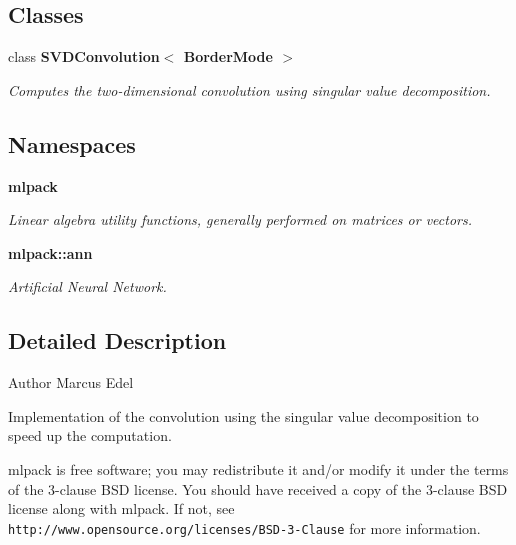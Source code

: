 \subsection*{Classes}
\begin{DoxyCompactItemize}
\item 
class \textbf{ S\+V\+D\+Convolution$<$ Border\+Mode $>$}
\begin{DoxyCompactList}\small\item\em Computes the two-\/dimensional convolution using singular value decomposition. \end{DoxyCompactList}\end{DoxyCompactItemize}
\subsection*{Namespaces}
\begin{DoxyCompactItemize}
\item 
 \textbf{ mlpack}
\begin{DoxyCompactList}\small\item\em Linear algebra utility functions, generally performed on matrices or vectors. \end{DoxyCompactList}\item 
 \textbf{ mlpack\+::ann}
\begin{DoxyCompactList}\small\item\em Artificial Neural Network. \end{DoxyCompactList}\end{DoxyCompactItemize}


\subsection{Detailed Description}
\begin{DoxyAuthor}{Author}
Marcus Edel
\end{DoxyAuthor}
Implementation of the convolution using the singular value decomposition to speed up the computation.

mlpack is free software; you may redistribute it and/or modify it under the terms of the 3-\/clause B\+SD license. You should have received a copy of the 3-\/clause B\+SD license along with mlpack. If not, see {\tt http\+://www.\+opensource.\+org/licenses/\+B\+S\+D-\/3-\/\+Clause} for more information. 